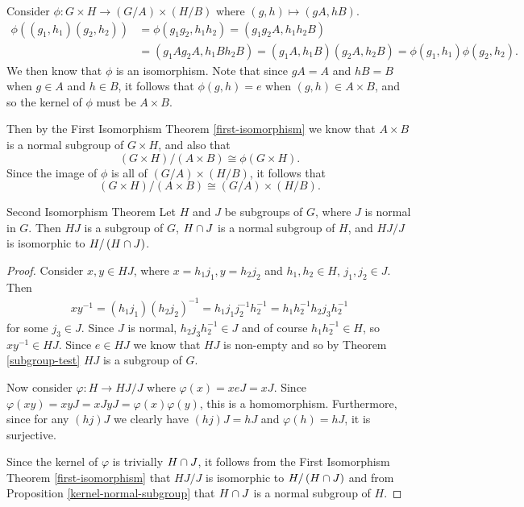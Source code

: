 \begin{exmp}
    Consider $\phi: G \times H \to \left(G/A\right) \times \left(H/B\right)$ where $(g, h) \mapsto (gA, hB)$.
    \begin{align*}
        \phi\left((g_1, h_1)(g_2, h_2)\right) &= \phi(g_1g_2, h_1h_2) = \left(g_1g_2A, h_1h_2B\right) \\
        &= \left(g_1Ag_2A, h_1Bh_2B\right) = (g_1A, h_1B)(g_2A, h_2B) = \phi(g_1, h_1)\phi(g_2, h_2).\
    \end{align*}
    We then know that $\phi$ is an isomorphism. Note that since $gA = A$ and $hB = B$ when $g \in A$ and $h \in B$, it follows that $\phi(g, h) = e$ when $(g, h) \in A \times B$, and so the kernel of $\phi$ must be $A \times B.$

    Then by the First Isomorphism Theorem \ref{first-isomorphism} we know that $A \times B$ is a normal subgroup of $G \times H$, and also that
    \[\left(G \times H\right)/\left(A \times B\right) \cong \phi(G \times H).\] Since the image of $\phi$ is all of $\left(G/A\right) \times \left(H/B\right)$, it follows that
    \[\left(G \times H\right)/\left(A \times B\right) \cong \left(G/A\right) \times \left(H/B\right).\]
\end{exmp}

\begin{thm}Second Isomorphism Theorem\label{second-isomorphism}\proofbreak
    Let $H$ and $J$ be subgroups of $G$, where $J$ is normal in $G$. Then $HJ$ is a subgroup of $G$, $H \cap J$ is a normal subgroup of $H$, and $HJ/J$ is isomorphic to $H/\left(H \cap J\right)$.
\end{thm}

\begin{proof}
    Consider $x, y \in HJ$, where $x = h_1j_1, y = h_2j_2$ and $h_1,h_2 \in H$, $j_1,j_2 \in J$. Then
    \begin{align*}
        xy^{-1} = \left(h_1j_1\right)\left(h_2j_2\right)^{-1} = h_1j_1j_2^{-1}h_2^{-1} = h_1h_2^{-1}h_2j_3h_2^{-1}
    \end{align*} for some $j_3 \in J$. Since $J$ is normal, $h_2j_3h_2^{-1} \in J$ and of course $h_1h_2^{-1} \in H$, so $xy^{-1} \in HJ$. Since $e \in HJ$ we know that $HJ$ is non-empty and so by Theorem \ref{subgroup-test} $HJ$ is a subgroup of $G$.

    Now consider $\varphi: H \to HJ/J$ where $\varphi(x) = xeJ = xJ$. Since $\varphi(xy) = xyJ = xJyJ = \varphi(x)\varphi(y)$, this is a homomorphism. Furthermore, since for any $(hj)J$ we clearly have $(hj)J = hJ$ and $\varphi(h) = hJ$, it is surjective.

    Since the kernel of $\varphi$ is trivially $H \cap J$, it follows from the First Isomorphism Theorem \ref{first-isomorphism} that $HJ/J$ is isomorphic to $H/\left(H \cap J\right)$ and from Proposition \ref{kernel-normal-subgroup} that $H \cap J$ is a normal subgroup of $H$.
\end{proof}

